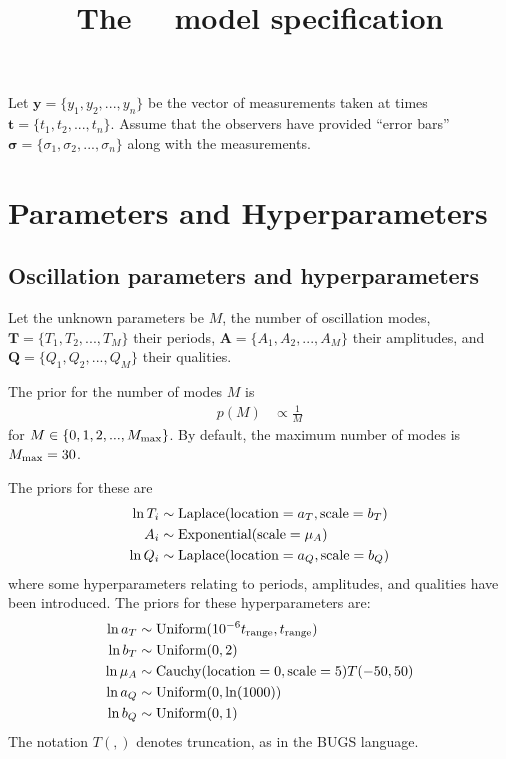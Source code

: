 \documentclass[a4paper, 12pt]{article}
\title{The~\Celery~ model specification}
\date{}
\newcommand{\Cauchy}{\textnormal{Cauchy}}
\newcommand{\Exponential}{\textnormal{Exponential}}
\newcommand{\Laplace}{\textnormal{Laplace}}
\newcommand{\location}{\textnormal{location}}
\newcommand{\scale}{\textnormal{scale}}
\newcommand{\Uniform}{\textnormal{Uniform}}
\begin{document}
\maketitle


\setlength{\parindent}{0pt}
\setlength{\parskip}{1em}

Let $\boldsymbol{y} = \{y_1, y_2, ..., y_n\}$ be the vector of measurements
taken at times $\boldsymbol{t} = \{t_1, t_2, ..., t_n\}$. Assume that the
observers have provided ``error bars''
$\boldsymbol{\sigma} = \{\sigma_1, \sigma_2, ..., \sigma_n\}$ along with the
measurements.

\section{Parameters and Hyperparameters}

\subsection{Oscillation parameters and hyperparameters}

Let the unknown parameters be $M$, the number of oscillation modes,
$\boldsymbol{T} = \{T_1, T_2, ..., T_M\}$ their periods,
$\boldsymbol{A} = \{A_1, A_2, ..., A_M\}$ their amplitudes,
and $\boldsymbol{Q} = \{Q_1, Q_2, ..., Q_M\}$ their qualities.

The prior for the number of modes $M$ is
\begin{align}
p(M) &\propto \frac{1}{M}
\end{align}
for $M \in \{0, 1, 2, ..., M_{\rm max}\}$. By default, the maximum number of
modes is $M_{\rm max} = 30$.

The priors for these are
\begin{align}
\ln T_i &\sim \Laplace(\location=a_T, \scale=b_T) \\
A_i &\sim \Exponential(\scale=\mu_A) \\
\ln Q_i &\sim \Laplace(\location=a_Q, \scale=b_Q)
\end{align}
where some hyperparameters relating to periods, amplitudes, and qualities
have been introduced. The priors for these hyperparameters are:
\begin{align}
\ln a_T   &\sim \Uniform(10^{-6}t_{\rm range}, t_{\rm range}) \\
\ln b_T   &\sim \Uniform(0, 2)\\
\ln \mu_A &\sim \Cauchy(\location=0, \scale=5)T(-50, 50) \\
\ln a_Q   &\sim \Uniform(0, \ln (1000)) \\
\ln b_Q   &\sim \Uniform(0, 1)
\end{align}
The notation $T(,)$ denotes truncation, as in the BUGS language.
\end{document}
